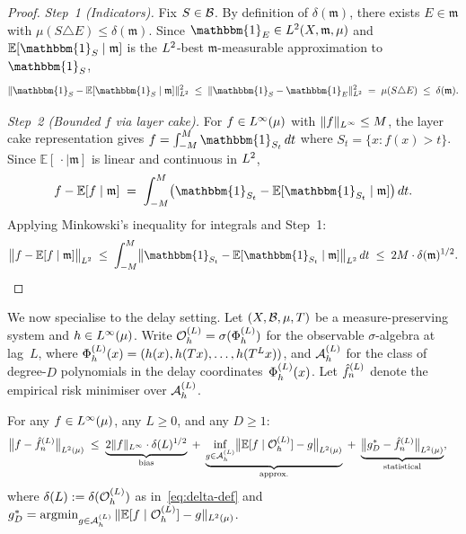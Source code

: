 \begin{proof}
\emph{Step~1 (Indicators).}
Fix $S \in \mathcal{B}$.
By definition of $\delta(\mathfrak{m})$, there exists $E \in \mathfrak{m}$
with $\mu(S \triangle E) \leq \delta(\mathfrak{m})$.
Since $\mathbbm{1}_E \in \Lp{2}(X, \mathfrak{m}, \mu)$ and
$\mathbb{E}[\mathbbm{1}_S \mid \mathfrak{m}]$ is the $L^{2}$-best
$\mathfrak{m}$-measurable approximation to $\mathbbm{1}_S$,
\[
  \|\mathbbm{1}_S - \mathbb{E}[\mathbbm{1}_S \mid \mathfrak{m}]\|_{\Lp{2}}^2
  \;\leq\;
  \|\mathbbm{1}_S - \mathbbm{1}_E\|_{\Lp{2}}^2
  \;=\; \mu(S \triangle E) \;\leq\; \delta(\mathfrak{m}).
\]

\emph{Step~2 (Bounded $f$ via layer cake).}
For $f \in L^{\infty}(\mu)$ with $\|f\|_{L^{\infty}} \leq M$, the layer
cake representation gives $f = \int_{-M}^{M} \mathbbm{1}_{S_t}\,dt$ where
$S_t = \{x : f(x) > t\}$.
Since $\mathbb{E}[\,\cdot\mid \mathfrak{m}]$ is linear and continuous in $L^{2}$,
\[
  f - \mathbb{E}[f \mid \mathfrak{m}]
  \;=\; \int_{-M}^{M}
    \bigl(\mathbbm{1}_{S_t} - \mathbb{E}[\mathbbm{1}_{S_t} \mid \mathfrak{m}]\bigr)\,dt.
\]
Applying Minkowski's inequality for integrals and Step~1:
\[
  \bigl\|f - \mathbb{E}[f \mid \mathfrak{m}]\bigr\|_{\Lp{2}}
  \;\leq\; \int_{-M}^{M}
    \bigl\|\mathbbm{1}_{S_t} - \mathbb{E}[\mathbbm{1}_{S_t} \mid \mathfrak{m}]\bigr\|_{\Lp{2}}\,dt
  \;\leq\; 2M \cdot \delta(\mathfrak{m})^{1/2}. \qedhere
\]
\end{proof}

We now specialise to the delay setting.
Let $(X, \mathcal{B}, \mu, T)$ be a measure-preserving system and $h \in L^{\infty}(\mu)$.
Write $\mathcal{O}_h^{(L)} = \sigma(\Phi_h^{(L)})$ for the observable $\sigma$-algebra at lag~$L$, where
$\Phi_h^{(L)}(x) = (h(x), h(Tx), \ldots, h(T^L x))$,
and $\mathcal{A}_h^{(L)}$ for the class of degree-$D$ polynomials in the delay
coordinates~$\Phi_h^{(L)}(x)$.
Let $\hat{f}_n^{(L)}$ denote the empirical risk minimiser over $\mathcal{A}_h^{(L)}$.

\begin{lemma}
\label{lem:three-term}
For any $f \in L^{\infty}(\mu)$, any $L \geq 0$, and any $D \geq 1$:
\begin{align}
  \bigl\|f - \hat{f}_n^{(L)}\bigr\|_{L^{2}(\mu)}
  &\;\leq\;
    \underbrace{2\|f\|_{L^{\infty}} \cdot \delta(L)^{1/2}}_{\text{bias}}
  \;+\;
    \underbrace{\inf_{g \in \mathcal{A}_h^{(L)}}\bigl\|
      \mathbb{E}[f \mid \mathcal{O}_h^{(L)}] - g
    \bigr\|_{L^{2}(\mu)}}_{\text{approx.}}
  \;+\;
    \underbrace{\bigl\|g_D^* - \hat{f}_n^{(L)}\bigr\|_{L^{2}(\mu)}}_{\text{statistical}},
  \label{eq:three-term}
\end{align}
where $\delta(L) := \delta(\mathcal{O}_h^{(L)})$ as in~\eqref{eq:delta-def} and
$g_D^* = \operatorname{argmin}_{g \in \mathcal{A}_h^{(L)}} \|\mathbb{E}[f \mid \mathcal{O}_h^{(L)}] - g\|_{L^{2}(\mu)}$.
\end{lemma}

